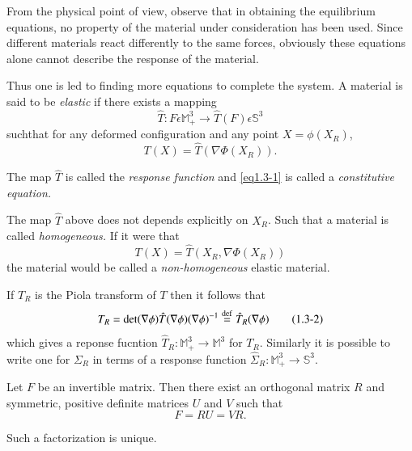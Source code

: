 From the physical point of view, observe that in obtaining the
equilibrium equations, no property of the material under consideration
has been used. Since different materials react differently to the same
forces, obviously these equations alone cannot describe the response of
the material. 

Thus one is led to finding more equations to complete the system. A
material is said to be \textit{elastic} if there exists a mapping  
$$
\hat{T} : F \epsilon \mathbb{M}^3_+ \to \hat{T}(F) \epsilon \mathbb{S}^3
$$
such\pageoriginale that for any deformed configuration and any point $X=\phi(X_R)$, 
\begin{equation*}
T(X)= \hat{T}(\nabla \Phi(X_R) ). \tag{1.3-1}\label{eq1.3-1}
\end{equation*}

The map $\hat{T}$ is called the \textit{response function} and
\eqref{eq1.3-1} is called a \textit{constitutive
  equation.}  

\begin{remark}\label{chap1-rem1.3.1} %
The map $\hat{T}$ above does not depends explicitly on $X_R$. Such
that a material is called \textit{homogeneous.} If it were that   
$$
T(X)= \hat{T}(X_R, \nabla \Phi (X_R))
$$
the material would be called a
\textit{non-homogeneous} elastic material. 
\end{remark}

If $T_R$ is the Piola transform of $T$ then it follows that 
\begin{equation*}
  T_R= \det (\nabla \phi)\hat{T}(\nabla \phi
  )(\nabla \phi)^{-1} \overset{\operatorname{def}}{=} \hat{T}_R(\nabla
  \phi) \tag{1.3-2} \label{eq1.3-2}
\end{equation*}
which gives a reponse fucntion $\hat{T}_R : \mathbb{M}^3_+ \to
\mathbb{M}^3$ for $T_R$. Similarly it is possible to write one for
$\Sigma_R$ in terms of a response function $\hat{\Sigma}_R:
\mathbb{M}^3_+ \to \mathbb{S}^3$.  

\begin{theorem}\label{chap1-thm1.3.1}%
Let $F$ be an invertible matrix. Then
there exist an orthogonal matrix $R$ and symmetric, positive definite
matrices $U$ and $V$ such that  
\begin{equation*}
  F=RU=VR. \tag{1.3-3}\label{eq1.3-3}
\end{equation*}

Such a factorization is unique. 
\end{theorem}

